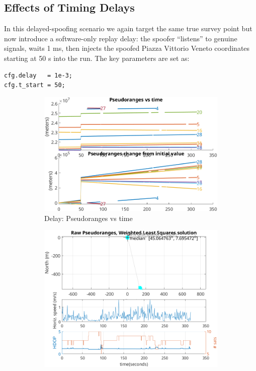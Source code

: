     \subsection{Effects of Timing Delays}

        In this delayed-spoofing scenario we again target the same true survey point but now introduce a software-only replay delay: the spoofer “listens” to genuine signals, waits 1 ms, then injects the spoofed Piazza Vittorio Veneto coordinates starting at 50 s into the run. 
        The key parameters are set as:

        \begin{verbatim}
cfg.delay   = 1e-3;
cfg.t_start = 50;
        \end{verbatim}


        \begin{figure}[h!]
            \centering
            \begin{subfigure}{0.23\textwidth}
                \includegraphics[width=\textwidth]{images/tests/Monte_Cappuccini/Spoofing/task6_figures/Samsung_A51_Monte_Cappuccini_fig1.png}
                \caption{Delay: Pseudoranges vs time}
            \end{subfigure}
            \hfill
            \begin{subfigure}{0.23\textwidth}
                \includegraphics[width=\textwidth]{images/tests/Monte_Cappuccini/Spoofing/task6_figures/Samsung_A51_Monte_Cappuccini_fig4.png}

\end{subfigure}
\end{figure}
